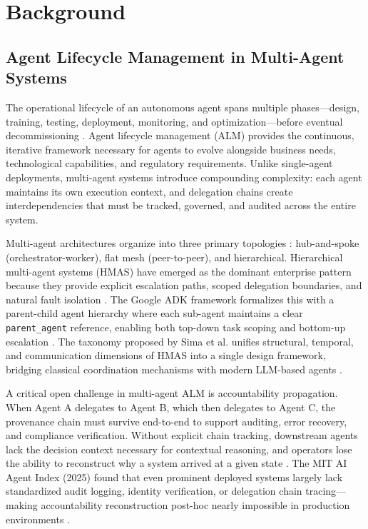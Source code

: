 \section{Background}

\subsection{Agent Lifecycle Management in Multi-Agent Systems}

The operational lifecycle of an autonomous agent spans multiple phases—design, training, testing, deployment, monitoring, and optimization—before eventual decommissioning \cite{onereach_alm_2026}. Agent lifecycle management (ALM) provides the continuous, iterative framework necessary for agents to evolve alongside business needs, technological capabilities, and regulatory requirements. Unlike single-agent deployments, multi-agent systems introduce compounding complexity: each agent maintains its own execution context, and delegation chains create interdependencies that must be tracked, governed, and audited across the entire system.

Multi-agent architectures organize into three primary topologies \cite{agentsindex_mas_2026}: hub-and-spoke (orchestrator-worker), flat mesh (peer-to-peer), and hierarchical. Hierarchical multi-agent systems (HMAS) have emerged as the dominant enterprise pattern because they provide explicit escalation paths, scoped delegation boundaries, and natural fault isolation \cite{arxiv_hmas_2508}. The Google ADK framework formalizes this with a parent-child agent hierarchy where each sub-agent maintains a clear \texttt{parent\_agent} reference, enabling both top-down task scoping and bottom-up escalation \cite{google_adk_2025}. The taxonomy proposed by Sima et al. unifies structural, temporal, and communication dimensions of HMAS into a single design framework, bridging classical coordination mechanisms with modern LLM-based agents \cite{arxiv_hmas_2508}.

A critical open challenge in multi-agent ALM is accountability propagation. When Agent A delegates to Agent B, which then delegates to Agent C, the provenance chain must survive end-to-end to support auditing, error recovery, and compliance verification. Without explicit chain tracking, downstream agents lack the decision context necessary for contextual reasoning, and operators lose the ability to reconstruct why a system arrived at a given state \cite{tianpan_provenance_2026}. The MIT AI Agent Index (2025) found that even prominent deployed systems largely lack standardized audit logging, identity verification, or delegation chain tracing—making accountability reconstruction post-hoc nearly impossible in production environments \cite{zylos_accountability_2026}.

